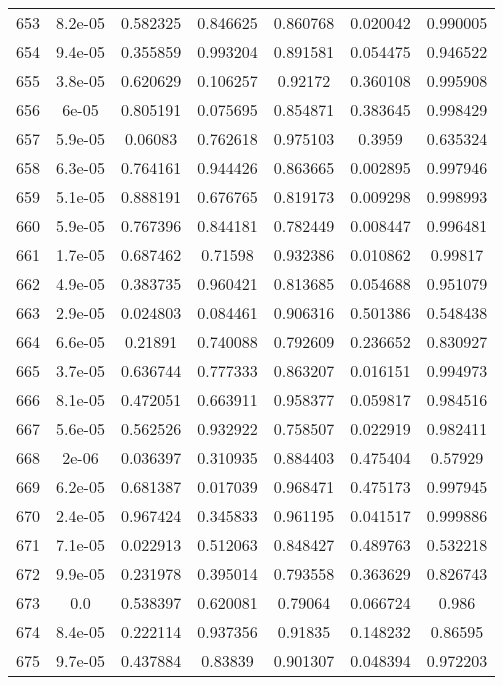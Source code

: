 \begin{table}
\begin{tabular}{c|c|c|c|c|c|c}
653 & 8.2e-05 & 0.582325 & 0.846625 & 0.860768 & 0.020042 & 0.990005\\
654 & 9.4e-05 & 0.355859 & 0.993204 & 0.891581 & 0.054475 & 0.946522\\
655 & 3.8e-05 & 0.620629 & 0.106257 & 0.92172 & 0.360108 & 0.995908\\
656 & 6e-05 & 0.805191 & 0.075695 & 0.854871 & 0.383645 & 0.998429\\
657 & 5.9e-05 & 0.06083 & 0.762618 & 0.975103 & 0.3959 & 0.635324\\
658 & 6.3e-05 & 0.764161 & 0.944426 & 0.863665 & 0.002895 & 0.997946\\
659 & 5.1e-05 & 0.888191 & 0.676765 & 0.819173 & 0.009298 & 0.998993\\
660 & 5.9e-05 & 0.767396 & 0.844181 & 0.782449 & 0.008447 & 0.996481\\
661 & 1.7e-05 & 0.687462 & 0.71598 & 0.932386 & 0.010862 & 0.99817\\
662 & 4.9e-05 & 0.383735 & 0.960421 & 0.813685 & 0.054688 & 0.951079\\
663 & 2.9e-05 & 0.024803 & 0.084461 & 0.906316 & 0.501386 & 0.548438\\
664 & 6.6e-05 & 0.21891 & 0.740088 & 0.792609 & 0.236652 & 0.830927\\
665 & 3.7e-05 & 0.636744 & 0.777333 & 0.863207 & 0.016151 & 0.994973\\
666 & 8.1e-05 & 0.472051 & 0.663911 & 0.958377 & 0.059817 & 0.984516\\
667 & 5.6e-05 & 0.562526 & 0.932922 & 0.758507 & 0.022919 & 0.982411\\
668 & 2e-06 & 0.036397 & 0.310935 & 0.884403 & 0.475404 & 0.57929\\
669 & 6.2e-05 & 0.681387 & 0.017039 & 0.968471 & 0.475173 & 0.997945\\
670 & 2.4e-05 & 0.967424 & 0.345833 & 0.961195 & 0.041517 & 0.999886\\
671 & 7.1e-05 & 0.022913 & 0.512063 & 0.848427 & 0.489763 & 0.532218\\
672 & 9.9e-05 & 0.231978 & 0.395014 & 0.793558 & 0.363629 & 0.826743\\
673 & 0.0 & 0.538397 & 0.620081 & 0.79064 & 0.066724 & 0.986\\
674 & 8.4e-05 & 0.222114 & 0.937356 & 0.91835 & 0.148232 & 0.86595\\
675 & 9.7e-05 & 0.437884 & 0.83839 & 0.901307 & 0.048394 & 0.972203\\
\end{tabular}
\end{table}
